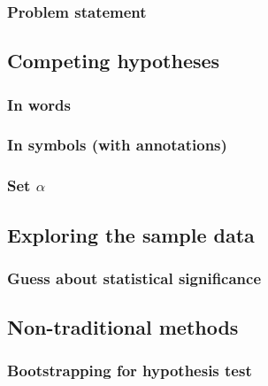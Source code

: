 \documentclass[12pt, krantz2,]{krantz}
\begin{document}
\hypertarget{problem-statement-4}{%
\subsubsection*{Problem statement}\label{problem-statement-4}}


\hypertarget{competing-hypotheses-4}{%
\subsection{Competing hypotheses}\label{competing-hypotheses-4}}

\hypertarget{in-words-4}{%
\subsubsection*{In words}\label{in-words-4}}


\hypertarget{in-symbols-with-annotations-4}{%
\subsubsection*{In symbols (with annotations)}\label{in-symbols-with-annotations-4}}


\hypertarget{set-alpha-4}{%
\subsubsection*{\texorpdfstring{Set \(\alpha\)}{Set \textbackslash{}alpha}}\label{set-alpha-4}}


\hypertarget{exploring-the-sample-data-4}{%
\subsection{Exploring the sample data}\label{exploring-the-sample-data-4}}

\hypertarget{guess-about-statistical-significance-4}{%
\subsubsection*{Guess about statistical significance}\label{guess-about-statistical-significance-4}}


\hypertarget{non-traditional-methods-4}{%
\subsection{Non-traditional methods}\label{non-traditional-methods-4}}

\hypertarget{bootstrapping-for-hypothesis-test-1}{%
\subsubsection*{Bootstrapping for hypothesis test}\label{bootstrapping-for-hypothesis-test-1}}
\end{document}
